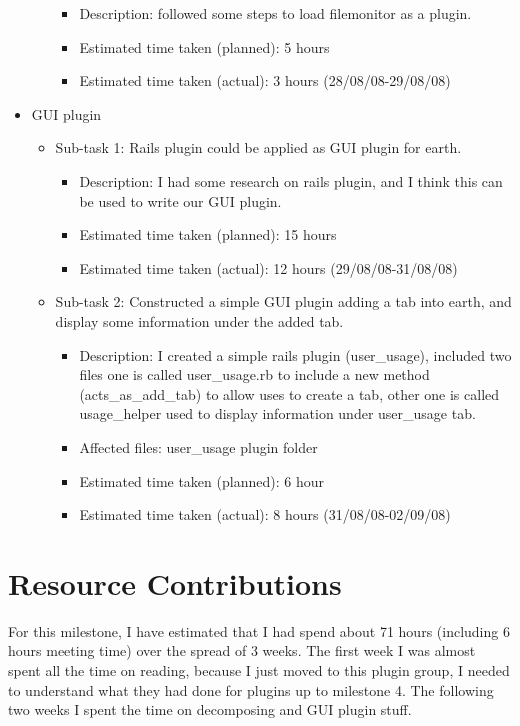 \begin{itemize}
\begin{itemize}
\begin{itemize}
					\item Description: followed some steps to load filemonitor as a plugin.
					\item Estimated time taken (planned): 5 hours
					\item Estimated time taken (actual): 3 hours (28/08/08-29/08/08)
				\end{itemize}	
	     \end{itemize}
	\item GUI plugin
	     \begin{itemize}
	         \item Sub-task 1: Rails plugin could be applied as GUI plugin for earth.
	            \begin{itemize}
	              \item Description: I had some research on rails plugin, and I think this can be used to write our GUI plugin.
					\item Estimated time taken (planned): 15 hours
					\item Estimated time taken (actual): 12 hours (29/08/08-31/08/08)
				 \end{itemize}
	         \item Sub-task 2: Constructed a simple GUI plugin adding a tab into earth, and display some information under the added tab.
	            \begin{itemize}
				    \item Description: I created a simple rails plugin (user\_usage), included two files one is called user\_usage.rb to include a new method (acts\_as\_add\_tab) to allow uses to create a tab, other one is called usage\_helper used to display information under user\_usage tab.
					\item Affected files: user\_usage plugin folder
					\item Estimated time taken (planned): 6 hour
					\item Estimated time taken (actual): 8 hours (31/08/08-02/09/08)
				 \end{itemize}
	     \end{itemize}
\end{itemize}

\section*{Resource Contributions}

For this milestone, I have estimated that I had spend about 71 hours (including 6 hours meeting time) over the spread of 3 weeks. The first week I was almost spent all the time on reading, because I just moved to this plugin group, I needed to understand what they had done for plugins up to milestone 4. The following two weeks I spent the time on decomposing and GUI plugin stuff.

